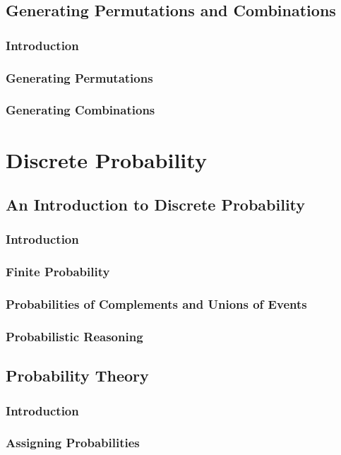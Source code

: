 \documentclass[11pt]{book}
\begin{document}
 \section{Generating Permutations and Combinations}
  \subsection{Introduction}
  \subsection{Generating Permutations}
  \subsection{Generating Combinations}
 
\chapter{Discrete Probability}
 \section{An Introduction to Discrete Probability}
  \subsection{Introduction}
  \subsection{Finite Probability}
  \subsection{Probabilities of Complements and Unions of Events}
  \subsection{Probabilistic Reasoning}
  
 \section{Probability Theory}
  \subsection{Introduction}
  \subsection{Assigning Probabilities}
\end{document}
